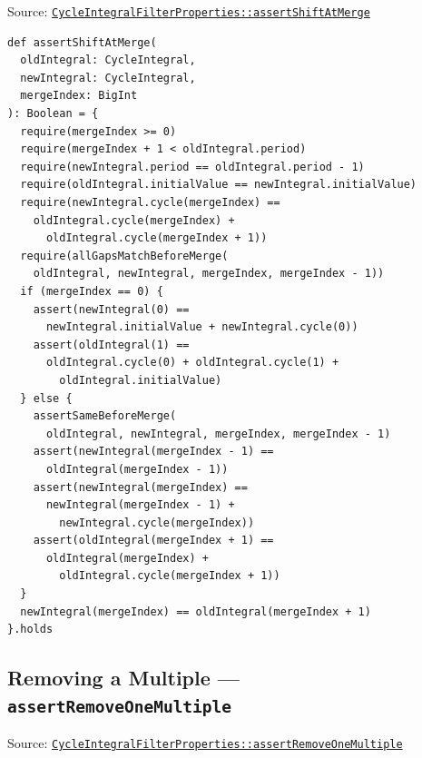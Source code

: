 {\raggedright Source: \href{https://github.com/thiagomata/prime-numbers/blob/integral-cycle-article-v1.0.0/src/main/scala/v1/chapter4/cycle/integral/recursive/properties/CycleIntegralFilterProperties.scala}{\texttt{Cycle\allowbreak Integral\allowbreak Filter\allowbreak Properties::assert\allowbreak Shift\allowbreak At\allowbreak Merge}}\par}

\begin{lstlisting}[style=scala]
def assertShiftAtMerge(
  oldIntegral: CycleIntegral,
  newIntegral: CycleIntegral,
  mergeIndex: BigInt
): Boolean = {
  require(mergeIndex >= 0)
  require(mergeIndex + 1 < oldIntegral.period)
  require(newIntegral.period == oldIntegral.period - 1)
  require(oldIntegral.initialValue == newIntegral.initialValue)
  require(newIntegral.cycle(mergeIndex) ==
    oldIntegral.cycle(mergeIndex) +
      oldIntegral.cycle(mergeIndex + 1))
  require(allGapsMatchBeforeMerge(
    oldIntegral, newIntegral, mergeIndex, mergeIndex - 1))
  if (mergeIndex == 0) {
    assert(newIntegral(0) ==
      newIntegral.initialValue + newIntegral.cycle(0))
    assert(oldIntegral(1) ==
      oldIntegral.cycle(0) + oldIntegral.cycle(1) +
        oldIntegral.initialValue)
  } else {
    assertSameBeforeMerge(
      oldIntegral, newIntegral, mergeIndex, mergeIndex - 1)
    assert(newIntegral(mergeIndex - 1) ==
      oldIntegral(mergeIndex - 1))
    assert(newIntegral(mergeIndex) ==
      newIntegral(mergeIndex - 1) +
        newIntegral.cycle(mergeIndex))
    assert(oldIntegral(mergeIndex + 1) ==
      oldIntegral(mergeIndex) +
        oldIntegral.cycle(mergeIndex + 1))
  }
  newIntegral(mergeIndex) == oldIntegral(mergeIndex + 1)
}.holds
\end{lstlisting}

\subsection{Removing a Multiple --- \texorpdfstring{\texttt{assert\allowbreak Remove\allowbreak One\allowbreak Multiple}}{assertRemoveOneMultiple}}

{\raggedright Source: \href{https://github.com/thiagomata/prime-numbers/blob/integral-cycle-article-v1.0.0/src/main/scala/v1/chapter4/cycle/integral/recursive/properties/CycleIntegralFilterProperties.scala}{\texttt{Cycle\allowbreak Integral\allowbreak Filter\allowbreak Properties::assert\allowbreak Remove\allowbreak One\allowbreak Multiple}}\par}

